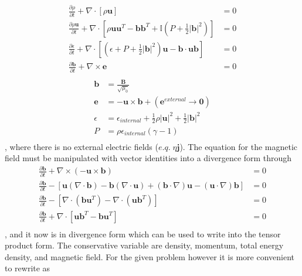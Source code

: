 \documentclass[paper=a4, fontsize=11pt]{scrartcl}
\newcommand{\pfrac}[2]{\frac{\partial#1}{\partial#2}}
\numberwithin{equation}{section}                %
\numberwithin{figure}{section}                  %
\numberwithin{table}{section}                           %
\begin{document}
\minipage{\textwidth}
  \begin{align*}
    \pfrac{\rho}{t} + \nabla \cdot \left[\rho \mathbf{u}\right] &= 0 \\
    \pfrac{\rho \mathbf{u}}{t} + \nabla \cdot \left[\rho \mathbf{u}\mathbf{u}^T - \mathbf{b}\mathbf{b}^T + \mathbb{I}\left(P + \frac{1}{2}|\mathbf{b}|^2\right)\right] &= 0 \\
    \pfrac{\epsilon}{t} + \nabla \cdot \left[\left(\epsilon + P + \frac{1}{2}|\mathbf{b}|^2\right)\mathbf{u}- \mathbf{b}\cdot\mathbf{u}\mathbf{b}\right] &= 0 \\
    \pfrac{\mathbf{b}}{t} + \nabla\times\mathbf{e} &= 0 \\
  \end{align*}
  \endminipage\hfill
  \begin{align*}
    \mathbf{b} &= \frac{\mathbf{B}}{\sqrt{\mu_0}} \\
    \mathbf{e} &= - \mathbf{u} \times \mathbf{b} +\left(\mathbf{e}^{external}\rightarrow\mathbf{0}\right)\\
    \epsilon &= \epsilon_{internal} + \frac{1}{2}\rho|\mathbf{u}|^2 + \frac{1}{2}|\mathbf{b}|^2\\
    P &=\rho \epsilon_{internal} (\gamma - 1) \\
  \end{align*}
  \endminipage\hfill
  \endminipage, where there is no external electric fields ($e.q.\;\eta \mathbf{j}$). The equation for the magnetic field must be manipulated with vector identities into a divergence form through
  \begin{align*}
    \pfrac{\mathbf{b}}{t} + \nabla\times(-\mathbf{u}\times\mathbf{b}) &= 0\\
    \pfrac{\mathbf{b}}{t} - \left[\mathbf{u}(\nabla\cdot\mathbf{b})-\mathbf{b}(\nabla\cdot\mathbf{u})+(\mathbf{b}\cdot \nabla)\mathbf{u}-(\mathbf{u}\cdot\nabla)\mathbf{b}\right] &= 0\\
    \pfrac{\mathbf{b}}{t} - \left[\nabla\cdot(\mathbf{b}\mathbf{u}^T)-\nabla\cdot(\mathbf{u}\mathbf{b}^T)\right] &= 0\\
    \pfrac{\mathbf{b}}{t} + \nabla\cdot\left[\mathbf{u}\mathbf{b}^T-\mathbf{b}\mathbf{u}^T\right] &= 0\\
  \end{align*}, and it now is in divergence form which can be used to write into the tensor product form. The conservative variable are density, momentum, total energy density, and magnetic field. For the given problem however it is more convenient to rewrite as
\end{document}

